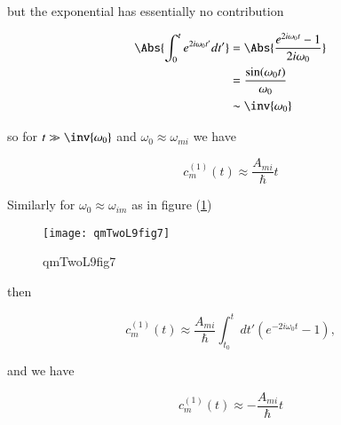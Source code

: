 but the exponential has essentially no contribution

\begin{align*}
\Abs{\int_0^t e^{2 i \omega_0 t'} dt' } 
&= 
\Abs{\frac{e^{2 i \omega_0 t} -1 }{2 i \omega_0}}  \\
&= 
\frac{\sin(\omega_0 t)}{\omega_0} \\
&\sim \inv{\omega_0}
\end{align*}

so for $t \gg \inv{\omega_0}$ and $\omega_0 \approx \omega_{mi}$ we have 

\begin{equation}\label{eqn:qmTwoL9:570}
c_m^{(1)}(t) \approx \frac{A_{mi}}{\hbar} t
\end{equation}

Similarly for $\omega_0 \approx \omega_{im}$ as in figure (\ref{fig:qmTwoL9fig7}) 

\begin{figure}[htp]
\centering
\texttt{[image: qmTwoL9fig7]}
\caption{qmTwoL9fig7}\label{fig:qmTwoL9fig7}
\end{figure}

then

\begin{equation}\label{eqn:qmTwoL9:590}
c_m^{(1)}(t) \approx
\frac{A_{mi}}{\hbar} \int_{t_0}^t dt' 
\left( 
e^{-2 i \omega_0 t }
-1
\right),
\end{equation}

and we have

\begin{equation}\label{eqn:qmTwoL9:610}
c_m^{(1)}(t) \approx -\frac{A_{mi}}{\hbar} t
\end{equation}

\EndArticle
